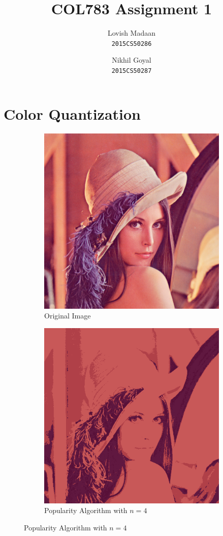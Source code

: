 \documentclass{article}
\title{COL783 Assignment 1}
\date{}
\author{Lovish Madaan \\ \texttt{2015CS50286} \and Nikhil Goyal \\ \texttt{2015CS50287}}
\begin{document}
\maketitle
\section{Color Quantization}


\begin{figure}[!ht]
\begin{subfigure}{.5\textwidth}
\centering
\includegraphics[width=.75\linewidth]{lenna.png}
\caption{Original Image}
\end{subfigure}
\begin{subfigure}{.5\textwidth}
\centering
\includegraphics[width=.75\linewidth]{img1_1.png}
\caption{Popularity Algorithm with $n = 4$}
\end{subfigure}
\end{figure}
\end{document}
